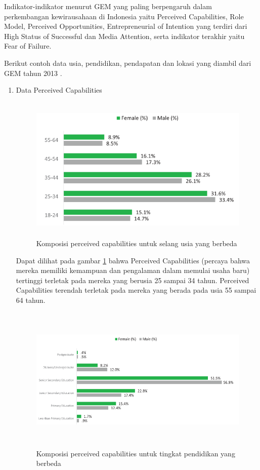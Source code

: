 Indikator-indikator menurut GEM yang paling berpengaruh dalam perkembangan kewirausahaan di Indonesia yaitu Perceived Capabilities, Role Model, Perceived Opportunities, Entrepreneurial of Intention yang terdiri dari High Status of Successful dan Media Attention, serta indikator terakhir yaitu Fear of Failure. 


Berikut contoh data usia, pendidikan, pendapatan dan lokasi yang diambil dari GEM tahun 2013 \cite{GEM2013}. 

\begin{enumerate}
	\item Data Perceived Capabilities
\begin{figure} [H]
	\centering  
	\includegraphics[width=14cm, height=7cm]{umurPC2013} 
	\caption[Komposisi perceived capabilities untuk selang usia yang berbeda]{Komposisi perceived capabilities untuk selang usia yang berbeda} 
	\label{fig:PCUmur} 
\end{figure}

Dapat dilihat pada gambar \ref{fig:PCUmur} bahwa Perceived Capabilities (percaya bahwa mereka memiliki kemampuan dan pengalaman dalam memulai usaha baru) tertinggi terletak pada mereka yang berusia 25 sampai 34 tahun. Perceived Capabilities terendah terletak pada mereka yang berada pada usia 55 sampai 64 tahun.

\begin{figure} [H]
	\centering  
	\includegraphics[width=14cm, height=7cm]{pendidikanPC2013} 
	\caption[Komposisi perceived capabilities untuk tingkat pendidikan yang berbeda]{Komposisi perceived capabilities untuk tingkat pendidikan yang berbeda} 
	\label{fig:PCPendidikan} 
\end{figure}


\end{enumerate}
